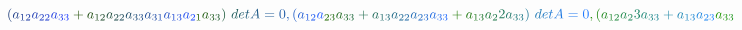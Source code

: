\documentclass[12pt]{article}
\begin{document}
\begin{displaymath}
\mathcolor[RGB]{30,60,120}{(} \mathcolor[RGB]{30,60,135}{a} _ { \mathcolor[RGB]{30,60,150}{1} \mathcolor[RGB]{30,60,165}{2} } \mathcolor[RGB]{30,60,180}{a} _ { \mathcolor[RGB]{30,60,195}{2} \mathcolor[RGB]{30,60,210}{2} } \mathcolor[RGB]{30,60,225}{a} _ { \mathcolor[RGB]{30,60,240}{3} \mathcolor[RGB]{30,60,255}{3} } \mathcolor[RGB]{30,75,0}{+} \mathcolor[RGB]{30,75,15}{a} _ { \mathcolor[RGB]{30,75,30}{1} \mathcolor[RGB]{30,75,45}{2} } \mathcolor[RGB]{30,75,60}{a} _ { \mathcolor[RGB]{30,75,75}{2} \mathcolor[RGB]{30,75,90}{2} } \mathcolor[RGB]{30,75,105}{a} _ { \mathcolor[RGB]{30,75,120}{3} \mathcolor[RGB]{30,75,135}{3} } \mathcolor[RGB]{30,75,150}{a} _ { \mathcolor[RGB]{30,75,165}{3} \mathcolor[RGB]{30,75,180}{1} } \mathcolor[RGB]{30,75,195}{a} _ { \mathcolor[RGB]{30,75,210}{1} \mathcolor[RGB]{30,75,225}{3} } \mathcolor[RGB]{30,75,240}{a} _ { \mathcolor[RGB]{30,75,255}{2} \mathcolor[RGB]{30,90,0}{1} } \mathcolor[RGB]{30,90,15}{a} _ { \mathcolor[RGB]{30,90,30}{3} \mathcolor[RGB]{30,90,45}{3} } \mathcolor[RGB]{30,90,60}{)} \mathcolor[RGB]{30,90,75}{\operatorname*} { \mathcolor[RGB]{30,90,90}{d} \mathcolor[RGB]{30,90,105}{e} \mathcolor[RGB]{30,90,120}{t} } \mathcolor[RGB]{30,90,135}{A} \mathcolor[RGB]{30,90,150}{=} \mathcolor[RGB]{30,90,165}{0} \mathcolor[RGB]{30,90,180}{,} \mathcolor[RGB]{30,90,195}{(} \mathcolor[RGB]{30,90,210}{a} _ { \mathcolor[RGB]{30,90,225}{1} \mathcolor[RGB]{30,90,240}{2} } \mathcolor[RGB]{30,90,255}{a} _ { \mathcolor[RGB]{30,105,0}{2} \mathcolor[RGB]{30,105,15}{3} } \mathcolor[RGB]{30,105,30}{a} _ { \mathcolor[RGB]{30,105,45}{3} \mathcolor[RGB]{30,105,60}{3} } \mathcolor[RGB]{30,105,75}{+} \mathcolor[RGB]{30,105,90}{a} _ { \mathcolor[RGB]{30,105,105}{1} \mathcolor[RGB]{30,105,120}{3} } \mathcolor[RGB]{30,105,135}{a} _ { \mathcolor[RGB]{30,105,150}{2} \mathcolor[RGB]{30,105,165}{2} } \mathcolor[RGB]{30,105,180}{a} _ { \mathcolor[RGB]{30,105,195}{2} \mathcolor[RGB]{30,105,210}{3} } \mathcolor[RGB]{30,105,225}{a} _ { \mathcolor[RGB]{30,105,240}{3} \mathcolor[RGB]{30,105,255}{3} } \mathcolor[RGB]{30,120,0}{+} \mathcolor[RGB]{30,120,15}{a} _ { \mathcolor[RGB]{30,120,30}{1} \mathcolor[RGB]{30,120,45}{3} } \mathcolor[RGB]{30,120,60}{a} _ { \mathcolor[RGB]{30,120,75}{2} } \mathcolor[RGB]{30,120,90}{2} \mathcolor[RGB]{30,120,105}{a} _ { \mathcolor[RGB]{30,120,120}{3} \mathcolor[RGB]{30,120,135}{3} } \mathcolor[RGB]{30,120,150}{)} \mathcolor[RGB]{30,120,165}{\operatorname*} { \mathcolor[RGB]{30,120,180}{d} \mathcolor[RGB]{30,120,195}{e} \mathcolor[RGB]{30,120,210}{t} } \mathcolor[RGB]{30,120,225}{A} \mathcolor[RGB]{30,120,240}{=} \mathcolor[RGB]{30,120,255}{0} \mathcolor[RGB]{30,135,0}{,} \mathcolor[RGB]{30,135,15}{(} \mathcolor[RGB]{30,135,30}{a} _ { \mathcolor[RGB]{30,135,45}{1} \mathcolor[RGB]{30,135,60}{2} } \mathcolor[RGB]{30,135,75}{a} _ { \mathcolor[RGB]{30,135,90}{2} } \mathcolor[RGB]{30,135,105}{3} \mathcolor[RGB]{30,135,120}{a} _ { \mathcolor[RGB]{30,135,135}{3} \mathcolor[RGB]{30,135,150}{3} } \mathcolor[RGB]{30,135,165}{+} \mathcolor[RGB]{30,135,180}{a} _ { \mathcolor[RGB]{30,135,195}{1} \mathcolor[RGB]{30,135,210}{3} } \mathcolor[RGB]{30,135,225}{a} _ { \mathcolor[RGB]{30,135,240}{2} \mathcolor[RGB]{30,135,255}{3} } \mathcolor[RGB]{30,150,0}{a} _ { \mathcolor[RGB]{30,150,15}{3} \mathcolor[RGB]{30,150,30}{3} } 
\end{displaymath}
\end{document}
